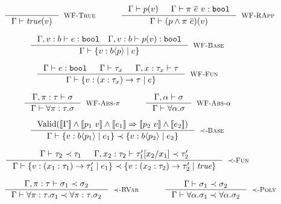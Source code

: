 \begin{figure}[ht!]

$$\begin{array}{ccc}
\inference
  {}
  {\isWellFormed{\Gamma}{\true(\vref)}}
  [\wtTrue]
&
\quad
&
\inference
    {\isWellFormed{\Gamma}{\areft(\vref)} && 
     \hastype{\Gamma}{\rvapp{\rvar}{e} \ \vref}{\tbbool}
    }
    {\isWellFormed{\Gamma}{(\areft \wedge \rvapp{\rvar}{e})(\vref)}}
    [\wtRVApp]
\end{array}$$

$$\inference
    {\hastype{\Gamma, \vref:b}{\reft}{\tbbool} \quad 
     \hastype{\Gamma, \vref:b}{\areft(\vref)}{\tbbool}
    }
    {\isWellFormed{\Gamma}{\tpref{b}{\areft}{\reft}}}
    [\wtBase]
$$

$$
\inference
    {
	\hastype{\Gamma}{\reft}{\tbbool} &&
    \isWellFormed{\Gamma}{\tau_x} &&
	\isWellFormed{\Gamma, x:\tau_x}{\tau}
    }
    {\isWellFormed{\Gamma}{\trfun{x}{\tau_x}{\tau}{\reft}}}
    [\wtFun]
$$

$$\begin{array}{ccc}
\inference
  {\isWellFormed{\Gamma, \rvar:\tau}{\sigma}}
  {\isWellFormed{\Gamma}{\tpabs{\rvar}{\tau}{\sigma}}}
  [\wtPred]
&
\quad
&
\inference
    {\isWellFormed{\Gamma, \alpha}{\sigma}}
    {\isWellFormed{\Gamma}{\ttabs{\alpha}{\sigma}}}
    [\wtPoly]
\end{array}$$

\medskip {}

$$
\inference
   {\text{Valid}(\inter{\Gamma} \land \inter{\areft_1\ \vref} \land \inter{\reft_1} 
                 \Rightarrow \inter{\areft_2\ \vref} \land \inter{\reft_2})}
   {\isSubType{\Gamma}{\tpref{b}{\areft_1}{\reft_1}}{\tpref{b}{\areft_2}{\reft_2}}}
   [\tsubBase]
$$

$$
\inference
   {%
	\isSubType{\Gamma}{\tau_2}{\tau_1} &
	\isSubType{\Gamma, x_2:{\tau_2}}{\SUBST{\tau_1'}{x_1}{x_2}}{\tau_2'}	
   }
   {\isSubType{\Gamma}
	  {\trfun{x_1}{\tau_1}{\tau_1'}{\reft_1}}
	  {\trfun{x_2}{\tau_2}{\tau_2'}{\true}}
}[\tsubFun]
$$


$$
\begin{array}{ccc}
\inference
   {\isSubType{\Gamma, \rvar:\tau}{\sigma_1}{\sigma_2}}
   {\isSubType{\Gamma}{\tpabs{\rvar}{\tau}{\sigma_1}}{\tpabs{\rvar}{\tau}{\sigma_2}}}
   [\tsubPred]
&
\quad
&
\inference
   {\isSubType{\Gamma}{\sigma_1}{\sigma_2}}
   {\isSubType{\Gamma}{\ttabs{\alpha}{\sigma_1}}{\ttabs{\alpha}{\sigma_2}}}
   [\tsubPoly]
\end{array}
$$


\end{figure}

